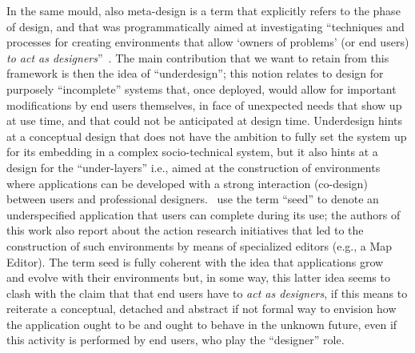 \documentclass{article}
\begin{document}
In the same mould, also meta-design is a term that explicitly refers to the phase of design, and that was programmatically aimed at investigating ``techniques and processes for creating environments that allow `owners of problems' (or end users) \emph{to act as designers}''~\citep[our emphasis,][]{fischer_meta-design:_2004}. The main contribution that we want to retain from this framework is then the idea of ``underdesign''; this notion relates to design for purposely ``incomplete'' systems that, once deployed, would allow for important modifications by end users themselves, in face of unexpected needs that show up at use time, and that could not be anticipated at design time. Underdesign hints at a conceptual design that does not have the ambition to fully set the system up for its embedding in a complex socio-technical system, but it also hints at a design for the ``under-layers'' i.e., aimed at the construction of environments where applications can be developed with a strong interaction (co-design) between users and professional designers.~\citet{fischer_meta-design:_2004} use the term ``seed'' to denote an underspecified application that users can complete during its use; the authors of this work also report about the action research initiatives that led to the construction of such environments by means of specialized editors (e.g., a Map Editor). The term seed is fully coherent with the idea that applications grow~\citep{truex_growing_1999} and evolve with their environments but, in some way, this latter idea seems to clash with the claim that that end users have to \emph{act as designers}, if this means to reiterate a conceptual, detached and abstract if not formal way to envision how the application ought to be and ought to behave in the unknown future, even if this activity is performed by end users, who play the ``designer'' role.
\end{document}
